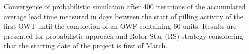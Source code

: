 \label{fig:convergence}
Convergence of probabilistic simulation after 400 iterations of the accumulated average lead time measured in days between the start of pilling activity of the first OWT until the completion of an OWF containing 60 units. Results are presented for probabilistic approach and Rotor Star (RS) strategy considering that the starting date of the project is first of March.